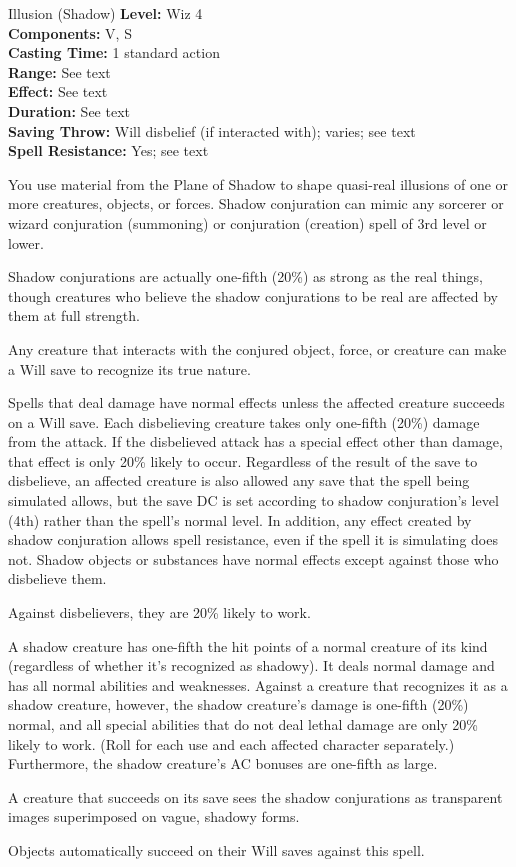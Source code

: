 {Illusion (Shadow)}
{
	\textbf{Level:}
	Wiz 4\\
	\textbf{Components:}
	V, S\\
	\textbf{Casting Time:}
	1 standard action\\
	\textbf{Range:}
	See text\\
	\textbf{Effect:}
	See text\\
	\textbf{Duration:}
	See text\\
	\textbf{Saving Throw:}
	Will disbelief (if interacted with); varies; see text\\
	\textbf{Spell Resistance:}
	Yes; see text\\
}
{
	You use material from the Plane of Shadow to shape quasi-real illusions of one or more creatures, objects, or forces. Shadow conjuration can mimic any sorcerer or wizard conjuration (summoning) or conjuration (creation) spell of 3rd level or lower.

	Shadow conjurations are actually one-fifth (20\%) as strong as the real things, though creatures who believe the shadow conjurations to be real are affected by them at full strength.

	Any creature that interacts with the conjured object, force, or creature can make a Will save to recognize its true nature.

	Spells that deal damage have normal effects unless the affected creature succeeds on a Will save. Each disbelieving creature takes only one-fifth (20\%) damage from the attack. If the disbelieved attack has a special effect other than damage, that effect is only 20\% likely to occur. Regardless of the result of the save to disbelieve, an affected creature is also allowed any save that the spell being simulated allows, but the save DC is set according to shadow conjuration's level (4th) rather than the spell's normal level. In addition, any effect created by shadow conjuration allows spell resistance, even if the spell it is simulating does not. Shadow objects or substances have normal effects except against those who disbelieve them.

	Against disbelievers, they are 20\% likely to work.

	A shadow creature has one-fifth the hit points of a normal creature of its kind (regardless of whether it's recognized as shadowy). It deals normal damage and has all normal abilities and weaknesses. Against a creature that recognizes it as a shadow creature, however, the shadow creature's damage is one-fifth (20\%) normal, and all special abilities that do not deal lethal damage are only 20\% likely to work. (Roll for each use and each affected character separately.) Furthermore, the shadow creature's AC bonuses are one-fifth as large.

	A creature that succeeds on its save sees the shadow conjurations as transparent images superimposed on vague, shadowy forms.

	Objects automatically succeed on their Will saves against this spell.

}

